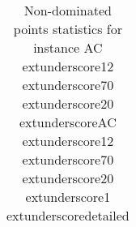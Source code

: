 \begin{table}
\caption{Non-dominated points statistics for instance AC	extunderscore12	extunderscore70	extunderscore20	extunderscoreAC	extunderscore12	extunderscore70	extunderscore20	extunderscore1	extunderscoredetailed}
\label{tab:stats/AC_12_70_20_AC_12_70_20_1_detailed}
\begin{tabular}{}
\toprule
\midrule
\bottomrule
\end{tabular}
\end{table}

